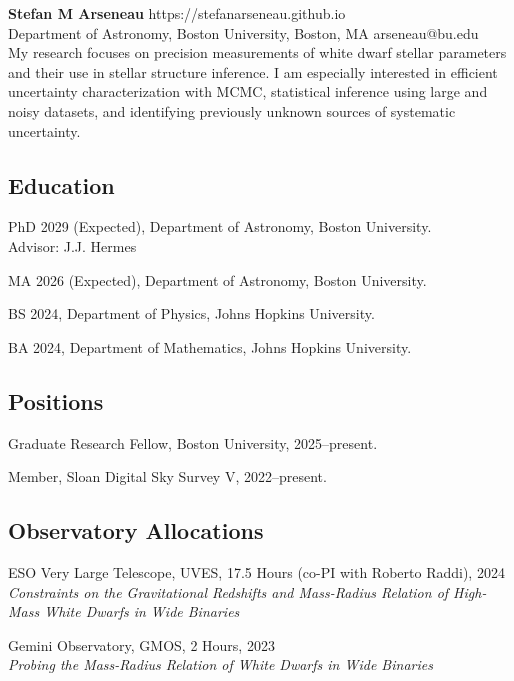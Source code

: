 \documentclass[12pt,letterpaper]{article}
\begin{document}
\thispagestyle{empty}\sloppy\sloppypar\raggedbottom

\textbf{\Large Stefan M Arseneau} \hfill
\textsf{\small https://stefanarseneau.github.io} \\[0.5ex]
Department of Astronomy, Boston University, Boston, MA  \hfill \textsf{\small arseneau@bu.edu} \\[0.5ex]

\vspace{0.5em}
\justifying \noindent My research focuses on precision measurements of white dwarf stellar parameters and their use in stellar structure inference. I am especially interested in efficient uncertainty characterization with MCMC, statistical inference using large and noisy datasets, and identifying previously unknown sources of systematic uncertainty.

\vspace{0.5em}
\hline

\subsection{Education}
\begin{list}{}{\cvlist}
  \item
        PhD 2029 (Expected), Department of Astronomy, Boston University. \\Advisor: J.J. Hermes
  \item
        MA 2026 (Expected), Department of Astronomy, Boston University.
  \item
        BS 2024, Department of Physics, Johns Hopkins University.
   \item
        BA 2024, Department of Mathematics, Johns Hopkins University.
\end{list}

\subsection{Positions}
\begin{list}{}{\cvlist}
  \item
        Graduate Research Fellow, Boston University, 2025--present.
  \item
        Member, Sloan Digital Sky Survey V, 2022--present.
\end{list}

\subsection{Observatory Allocations}
\begin{list}{}{\cvlist}
  \item
        ESO Very Large Telescope, UVES, 17.5 Hours (co-PI with Roberto Raddi), 2024 \\
        {\it Constraints on the Gravitational Redshifts and Mass-Radius Relation of High-Mass White Dwarfs in Wide Binaries}
  \item
       Gemini Observatory, GMOS, 2 Hours, 2023 \\
        {\it Probing the Mass-Radius Relation of White Dwarfs in Wide Binaries}
\end{list}
\end{document}
